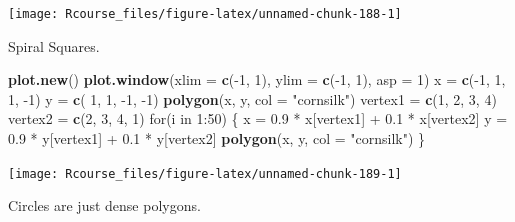 \documentclass[]{book}
\newenvironment{Shaded}{\begin{snugshade}}{\end{snugshade}}
\newcommand{\KeywordTok}[1]{\textcolor[rgb]{0.13,0.29,0.53}{\textbf{{#1}}}}
\newcommand{\DataTypeTok}[1]{\textcolor[rgb]{0.13,0.29,0.53}{{#1}}}
\newcommand{\DecValTok}[1]{\textcolor[rgb]{0.00,0.00,0.81}{{#1}}}
\newcommand{\FloatTok}[1]{\textcolor[rgb]{0.00,0.00,0.81}{{#1}}}
\newcommand{\StringTok}[1]{\textcolor[rgb]{0.31,0.60,0.02}{{#1}}}
\newcommand{\NormalTok}[1]{{#1}}
\theoremstyle{definition}
\theoremstyle{definition}
\theoremstyle{remark}
\begin{document}
\texttt{[image: Rcourse\_files/figure-latex/unnamed-chunk-188-1]}

Spiral Squares.

\begin{Shaded}
\begin{Highlighting}[]
\KeywordTok{plot.new}\NormalTok{()}
\KeywordTok{plot.window}\NormalTok{(}\DataTypeTok{xlim =} \KeywordTok{c}\NormalTok{(-}\DecValTok{1}\NormalTok{, }\DecValTok{1}\NormalTok{), }\DataTypeTok{ylim =} \KeywordTok{c}\NormalTok{(-}\DecValTok{1}\NormalTok{, }\DecValTok{1}\NormalTok{), }\DataTypeTok{asp =} \DecValTok{1}\NormalTok{)}
\NormalTok{x =}\StringTok{ }\KeywordTok{c}\NormalTok{(-}\DecValTok{1}\NormalTok{, }\DecValTok{1}\NormalTok{, }\DecValTok{1}\NormalTok{, -}\DecValTok{1}\NormalTok{)}
\NormalTok{y =}\StringTok{ }\KeywordTok{c}\NormalTok{( }\DecValTok{1}\NormalTok{, }\DecValTok{1}\NormalTok{, -}\DecValTok{1}\NormalTok{, -}\DecValTok{1}\NormalTok{)}
\KeywordTok{polygon}\NormalTok{(x, y, }\DataTypeTok{col =} \StringTok{"cornsilk"}\NormalTok{)}
\NormalTok{vertex1 =}\StringTok{ }\KeywordTok{c}\NormalTok{(}\DecValTok{1}\NormalTok{, }\DecValTok{2}\NormalTok{, }\DecValTok{3}\NormalTok{, }\DecValTok{4}\NormalTok{)}
\NormalTok{vertex2 =}\StringTok{ }\KeywordTok{c}\NormalTok{(}\DecValTok{2}\NormalTok{, }\DecValTok{3}\NormalTok{, }\DecValTok{4}\NormalTok{, }\DecValTok{1}\NormalTok{)}
\NormalTok{for(i in }\DecValTok{1}\NormalTok{:}\DecValTok{50}\NormalTok{) \{}
    \NormalTok{x =}\StringTok{ }\FloatTok{0.9} \NormalTok{*}\StringTok{ }\NormalTok{x[vertex1] +}\StringTok{ }\FloatTok{0.1} \NormalTok{*}\StringTok{ }\NormalTok{x[vertex2]}
    \NormalTok{y =}\StringTok{ }\FloatTok{0.9} \NormalTok{*}\StringTok{ }\NormalTok{y[vertex1] +}\StringTok{ }\FloatTok{0.1} \NormalTok{*}\StringTok{ }\NormalTok{y[vertex2]}
    \KeywordTok{polygon}\NormalTok{(x, y, }\DataTypeTok{col =} \StringTok{"cornsilk"}\NormalTok{)}
\NormalTok{\}}
\end{Highlighting}
\end{Shaded}

\texttt{[image: Rcourse\_files/figure-latex/unnamed-chunk-189-1]}

Circles are just dense polygons.
\end{document}
